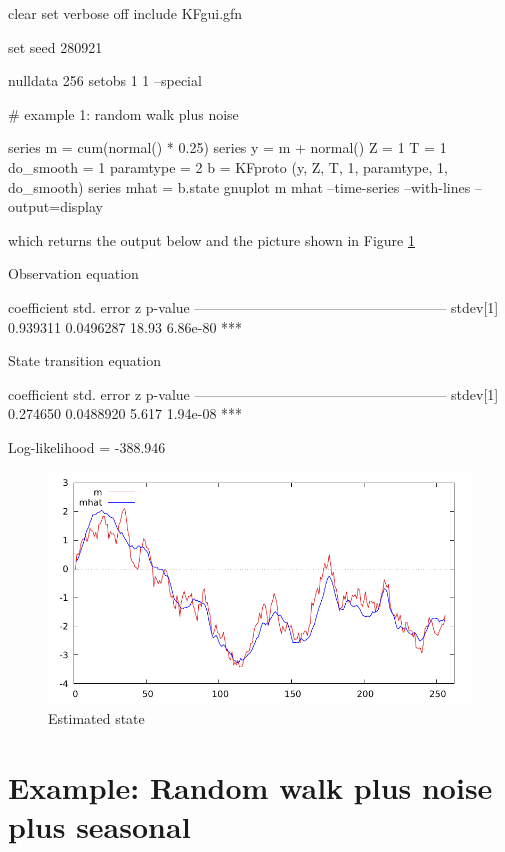 \documentclass[a4paper]{article}
\begin{document}
\begin{code}
clear
set verbose off
include KFgui.gfn

set seed 280921

nulldata 256
setobs 1 1 --special

# example 1: random walk plus noise

series m = cum(normal() * 0.25)
series y = m + normal()
Z = {1}
T = {1}
do_smooth = 1
paramtype = 2
b = KFproto (y, Z, T, 1, paramtype, 1, do_smooth)
series mhat = b.state
gnuplot m mhat --time-series --with-lines --output=display
\end{code}

which returns the output below and the picture shown in Figure
\ref{fig:state}

\begin{code}
Observation equation

             coefficient   std. error     z     p-value 
  ------------------------------------------------------
  stdev[1]    0.939311     0.0496287    18.93   6.86e-80 ***


State transition equation

             coefficient   std. error     z     p-value 
  ------------------------------------------------------
  stdev[1]    0.274650     0.0488920    5.617   1.94e-08 ***

  Log-likelihood = -388.946
\end{code}


\begin{figure}[hb]
  \centering
  \includegraphics[scale=0.7]{state}
  \caption{Estimated state}\label{fig:state}
\end{figure}

\section*{Example: Random walk plus noise plus seasonal}
\end{document}
